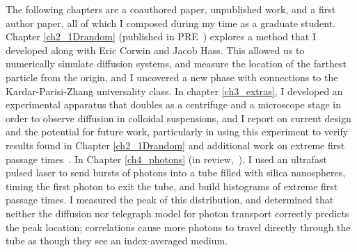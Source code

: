

The following chapters are a coauthored paper, unpublished work, and a first author paper, all of which I composed during my time as a graduate student. Chapter \ref{ch2_1Drandom} (published in PRE~\cite{hass_anomalous_2023}) explores a method that I developed along with Eric Corwin and Jacob Hass. This allowed us to numerically simulate diffusion systems, and measure the location of the farthest particle from the origin, and I uncovered a new phase with connections to the Kardar-Parisi-Zhang universality class. In chapter \ref{ch3_extras}, I developed an experimental apparatus that doubles as a centrifuge and a microscope stage in order to observe diffusion in colloidal suspensions, and I report on current design and the potential for future work, particularly in using this experiment to verify results found in Chapter \ref{ch2_1Drandom} and additional work on extreme first passage times~\cite{hass_first-passage_2024}. In Chapter \ref{ch4_photons} (in review,~\cite{carroll-godfrey_measurements_2025}), I used an ultrafast pulsed laser to send bursts of photons into a tube filled with silica nanospheres, timing the first photon to exit the tube, and build histograms of extreme first passage times. I measured the peak of this distribution, and determined that neither the diffusion nor telegraph model for photon transport correctly predicts the peak location; correlations cause more photons to travel directly through the tube as though they see an index-averaged medium.